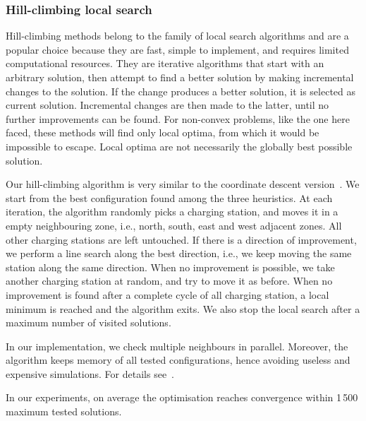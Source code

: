 \documentclass[review, letterpaper,3p, 11pt]{elsarticle}
\providecommand{\DIFdelbegin}{} %
\providecommand{\DIFdelend}{} %
\begin{document}
\subsubsection{Hill-climbing local search}

Hill-climbing methods belong to the family of local search algorithms and are a popular choice because they are fast, simple to implement, and requires limited computational resources. They are iterative algorithms that start with an arbitrary solution, then attempt to find a better solution by making incremental changes to the solution. If the change produces a better solution, it is selected as current solution. Incremental changes are then made to the latter, until no further improvements can be found.
For non-convex problems, like the one here faced, these methods will find only local optima, from which it would be impossible to escape. 
Local optima are not necessarily the globally best possible solution.

Our hill-climbing algorithm is very similar to the coordinate descent version~\cite{CoordinateDescent}.
We start from the best configuration found among the three heuristics.
At each iteration, the algorithm randomly picks a charging station, and moves it in a empty neighbouring zone, i.e., north, south, east and west adjacent zones. All other charging stations are left untouched. If there is a direction of improvement, we perform a line search along the best direction, i.e., we keep moving the same station along the same direction. When no improvement is possible, we take another charging station at random, and try to move it as before.
When no improvement is found after a complete cycle of all charging station, a local minimum is reached and the algorithm exits. We also stop the local search after a maximum number of visited solutions.

In our implementation, we check multiple neighbours in parallel. Moreover, the algorithm keeps memory of all tested configurations, hence avoiding useless and expensive simulations. For details see~\cite{MicheleGithub}. 
\DIFdelbegin %

\DIFdelend In our experiments, on average the optimisation reaches convergence within 1\,500 maximum tested solutions. 

\end{document}
